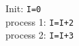 
\begin{tabbing}
  Init: \texttt{I=0}\\
  process 1: \texttt{I=I+2}\\
  process 2: \texttt{I=I+3}
\end{tabbing}
